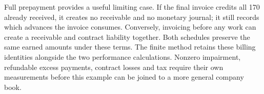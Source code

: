 Full prepayment provides a useful limiting case. If the final invoice credits
all 170 already received, it creates no receivable and no monetary journal;
it still records which advances the invoice consumes. Conversely, invoicing
before any work can create a receivable and contract liability together.
Both schedules preserve the same earned amounts under these terms. The
finite method retains these billing identities alongside the two performance
calculations. Nonzero impairment, refundable excess payments, contract losses
and tax require their own measurements before this example can be joined to
a more general company book.
